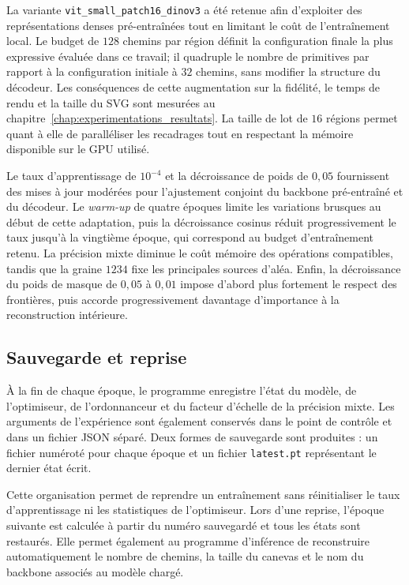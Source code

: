 \documentclass[12pt, a4paper, oneside]{report}
\begin{document}
La variante \texttt{vit\_small\_patch16\_dinov3} a été retenue afin d'exploiter des représentations denses pré-entraînées tout en limitant le coût de l'entraînement local. Le budget de $128$ chemins par région définit la configuration finale la plus expressive évaluée dans ce travail; il quadruple le nombre de primitives par rapport à la configuration initiale à $32$ chemins, sans modifier la structure du décodeur. Les conséquences de cette augmentation sur la fidélité, le temps de rendu et la taille du SVG sont mesurées au chapitre~\ref{chap:experimentations_resultats}. La taille de lot de $16$ régions permet quant à elle de paralléliser les recadrages tout en respectant la mémoire disponible sur le GPU utilisé.

Le taux d'apprentissage de $10^{-4}$ et la décroissance de poids de $0{,}05$ fournissent des mises à jour modérées pour l'ajustement conjoint du backbone pré-entraîné et du décodeur. Le \textit{warm-up} de quatre époques limite les variations brusques au début de cette adaptation, puis la décroissance cosinus réduit progressivement le taux jusqu'à la vingtième époque, qui correspond au budget d'entraînement retenu. La précision mixte diminue le coût mémoire des opérations compatibles, tandis que la graine $1234$ fixe les principales sources d'aléa. Enfin, la décroissance du poids de masque de $0{,}05$ à $0{,}01$ impose d'abord plus fortement le respect des frontières, puis accorde progressivement davantage d'importance à la reconstruction intérieure.

\subsection{Sauvegarde et reprise}

À la fin de chaque époque, le programme enregistre l'état du modèle, de l'optimiseur, de l'ordonnanceur et du facteur d'échelle de la précision mixte. Les arguments de l'expérience sont également conservés dans le point de contrôle et dans un fichier JSON séparé. Deux formes de sauvegarde sont produites : un fichier numéroté pour chaque époque et un fichier \texttt{latest.pt} représentant le dernier état écrit.

Cette organisation permet de reprendre un entraînement sans réinitialiser le taux d'apprentissage ni les statistiques de l'optimiseur. Lors d'une reprise, l'époque suivante est calculée à partir du numéro sauvegardé et tous les états sont restaurés. Elle permet également au programme d'inférence de reconstruire automatiquement le nombre de chemins, la taille du canevas et le nom du backbone associés au modèle chargé.
\end{document}
